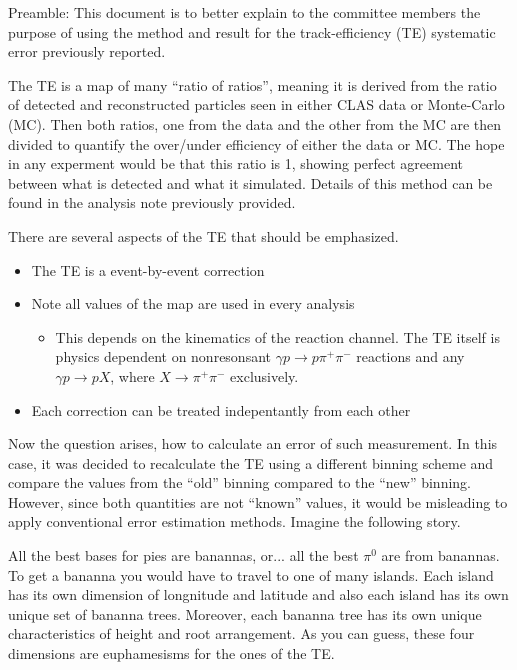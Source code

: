 \documentclass[12pt,a4paper]{report}
\author{Michael C. Kunkel}
\begin{document}
Preamble: This document is to better explain to the committee members the purpose of using the method and result for the track-efficiency (TE) systematic error previously reported.

The TE is a map of many ``ratio of ratios'', meaning it is derived from the ratio of detected and reconstructed particles seen in either CLAS data or Monte-Carlo (MC). Then both ratios, one from the data and the other from the MC are then divided to quantify the over/under efficiency of either the data or MC. The hope in any experment would be that this ratio is 1, showing perfect agreement between what is detected and what it simulated. Details of this method can be found in the analysis note previously provided.

There are several aspects of the TE that should be emphasized.
\begin{itemize}
\item The TE is a event-by-event correction

\item Note all values of the map are used in every analysis
\begin{itemize}
\item This depends on the kinematics of the reaction channel. The TE itself is physics dependent on nonresonsant $\gamma p  \to p \pi^{+} \pi^{-}$ reactions and any  $\gamma p  \to p X$, where $X \to \pi^{+} \pi^{-}$ exclusively.
\end{itemize}
\item Each correction can be treated indepentantly from each other
\end{itemize}
Now the question arises, how to calculate an error of such measurement. In this case, it was decided to recalculate the TE using a different binning scheme and compare the values from the ``old'' binning compared to the ``new'' binning. However, since both quantities are not ``known'' values, it would be misleading to apply conventional error estimation methods. Imagine the following story.

All the best bases for pies are banannas, or... all the best $\pi^{0}$ are from banannas. To get a bananna you would have to travel to one of many islands. Each island has its own dimension of longnitude and latitude and also each island has its own unique set of bananna trees. Moreover, each bananna tree has its own unique characteristics of height and root arrangement. As you can guess, these four dimensions are euphamesisms for the ones of the TE. 
\end{document}
